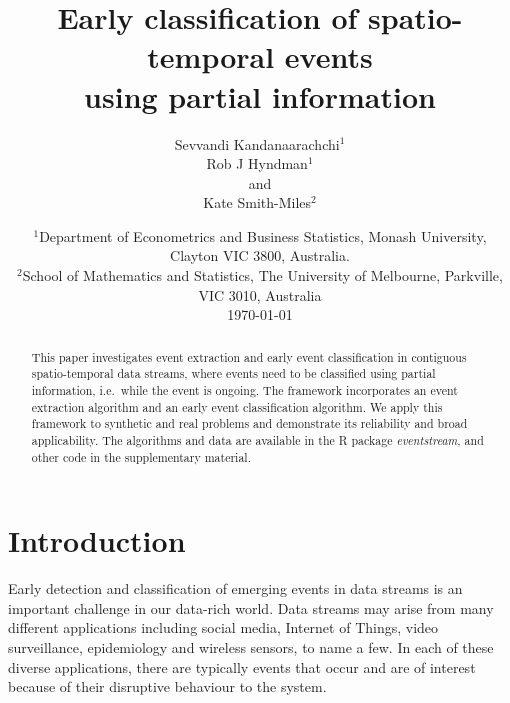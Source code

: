 \documentclass[a4paper,11pt]{article}
\begin{document}
\title{\bf{Early classification of spatio-temporal events \\ using partial information}}
\author{Sevvandi Kandanaarachchi$^1$ \\ Rob J Hyndman$^1$ \\ and \\ Kate Smith-Miles$^2$}
\date{%
	\scriptsize{ $^1$Department of Econometrics and Business Statistics, Monash University, Clayton VIC 3800, Australia.\\%
		$^2$School of Mathematics and Statistics, The University of Melbourne, Parkville, VIC 3010, Australia\\[2ex]}%
	\today
}

\begin{titlingpage}
	\maketitle
	\begin{abstract}
		This paper investigates event extraction and early event classification in contiguous spatio-temporal data streams, where events need to be classified using partial information, i.e.\ while the event is ongoing. The framework incorporates an event extraction algorithm and an early event classification algorithm. We apply this framework to synthetic and real problems and demonstrate its reliability and broad applicability. The algorithms and data are available in the R package \textit{eventstream}, and other code in the supplementary material.
	\end{abstract}
\end{titlingpage}


\section{Introduction}

Early detection and classification of emerging events in data streams is an important challenge in our data-rich world. Data streams may arise from many different applications including social media, Internet of Things, video surveillance, epidemiology and wireless sensors, to name a few. In each of these diverse applications, there are typically events that occur and are of interest because of their disruptive behaviour to the system.
\end{document}
